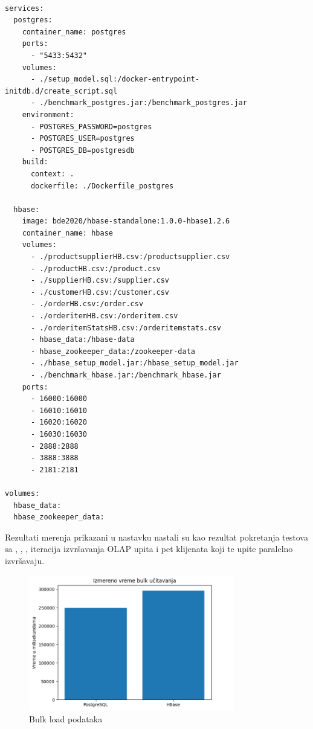 \documentclass[12pt,oneside]{memoir}
\begin{document}
\begin{lstlisting}[title={docker-compose.yml - Definicija kontejnera za OLAP okruženje},captionpos=b]

services: 
  postgres:
    container_name: postgres
    ports:
      - "5433:5432"
    volumes:
      - ./setup_model.sql:/docker-entrypoint-initdb.d/create_script.sql
      - ./benchmark_postgres.jar:/benchmark_postgres.jar
    environment:
      - POSTGRES_PASSWORD=postgres
      - POSTGRES_USER=postgres
      - POSTGRES_DB=postgresdb
    build:
      context: .
      dockerfile: ./Dockerfile_postgres

  hbase:
    image: bde2020/hbase-standalone:1.0.0-hbase1.2.6
    container_name: hbase
    volumes:
      - ./productsupplierHB.csv:/productsupplier.csv
      - ./productHB.csv:/product.csv
      - ./supplierHB.csv:/supplier.csv
      - ./customerHB.csv:/customer.csv
      - ./orderHB.csv:/order.csv
      - ./orderitemHB.csv:/orderitem.csv
      - ./orderitemStatsHB.csv:/orderitemstats.csv
      - hbase_data:/hbase-data
      - hbase_zookeeper_data:/zookeeper-data
      - ./hbase_setup_model.jar:/hbase_setup_model.jar
      - ./benchmark_hbase.jar:/benchmark_hbase.jar
    ports:
      - 16000:16000
      - 16010:16010
      - 16020:16020
      - 16030:16030
      - 2888:2888
      - 3888:3888
      - 2181:2181

volumes:
  hbase_data:
  hbase_zookeeper_data:
\end{lstlisting}

Rezultati merenja prikazani u nastavku nastali su kao rezultat pokretanja testova sa , , ,  iteracija izvršavanja OLAP upita i pet klijenata koji te upite paralelno izvršavaju.

\begin{figure}[!ht]
  \centering
  \includegraphics[width=0.8\textwidth]{bulk-load-vizualization.png}
  \caption{Bulk load podataka}
  \label{fig:grafikon}
\end{figure}
\end{document}
